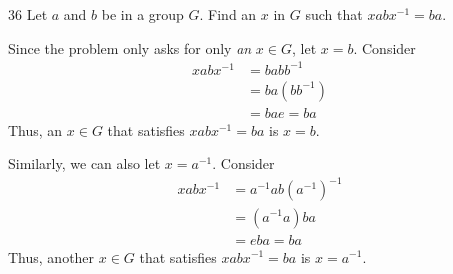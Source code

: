\begin{hwproblem}
{36}{
    Let \(a\) and \(b\) be in a group \(G\). Find an \(x\) in \(G\) such that \(xabx^{-1} = ba\).
}

Since the problem only asks for only \textit{an} \(x \in G\), let \(x = b\). Consider
\[
\begin{aligned}
    xabx^{-1} &= babb^{-1} \\
              &= ba(bb^{-1}) \\
              &= bae = ba
\end{aligned}
\]
Thus, an \(x \in G\) that satisfies \(xabx^{-1} = ba\) is \(x = b\).

Similarly, we can also let \(x = a^{-1}\). Consider
\[
\begin{aligned}
    xabx^{-1} &= a^{-1}ab(a^{-1})^{-1} \\
              &= (a^{-1}a)ba \\
              &= eba = ba
\end{aligned}
\]
Thus, another \(x \in G\) that satisfies \(xabx^{-1} = ba\) is \(x = a^{-1}\).
\end{hwproblem}

